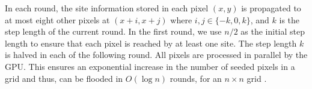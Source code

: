 \documentclass[format=acmsmall,screen,review,authordraft,nonacm]{acmart}
\begin{document}
In each round, the site information stored in each pixel $(x, y)$ is propagated
to at most eight other pixels at $(x+i, x+j)$ where $i,j \in \{-k, 0, k\}$, and
$k$ is the step length of the current round.  In the first round, we use $n/2$
as the initial step length to ensure that each pixel is reached by at least one
site. The step length $k$ is halved in each of the following round.  All pixels
are processed in parallel by the GPU. This ensures an exponential increase in
the number of seeded pixels in a grid and thus, can be flooded in $O(\log n)$
rounds, for an $n \times n$ grid \citep{yuan2011generalized}.


% 
%

\end{document}
